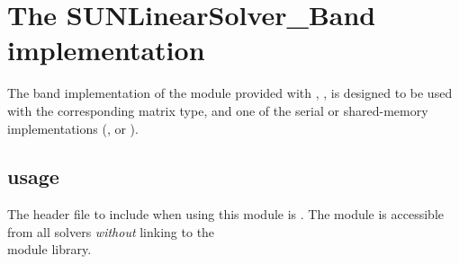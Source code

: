 \section{The SUNLinearSolver\_Band implementation}\label{ss:sunlinsol_band}

The band implementation of the {\sunlinsol} module provided with
{\sundials}, {\sunlinsolband}, is designed to be used with the
corresponding {\sunmatband} matrix type, and one of the serial or
shared-memory {\nvector} implementations ({\nvecs}, {\nvecopenmp} or
{\nvecpthreads}).


\subsection{{\sunlinsolband} usage}\label{ss:sunlinsol_band_usage}

The header file to include when using this module is
. The {\sunlinsolband} module 
is accessible from all {\sundials} solvers \textit{without}
linking to the \\ \noindent
{} module library.

